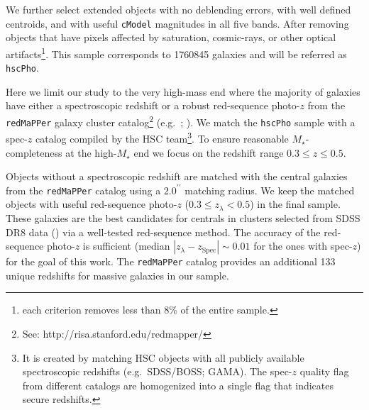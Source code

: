 \documentclass[a4paper,fleqn,usenatbib]{mnras}
\def\arcsec{{\prime\prime}}
\def\redm{\texttt{redMaPPer}}
\def\mstar{{$M_{\star}$}}
\begin{document}
    We further select extended objects with no deblending errors, with well defined 
    centroids, and with useful \texttt{cModel} magnitudes in all five bands. 
    After removing objects that have pixels affected by saturation, cosmic-rays, or 
    other optical artifacts\footnote{each criterion removes less than 8\% of the 
    entire sample.}. This sample corresponds to 1760845 galaxies and will be referred 
    as \texttt{hscPho}. 
        
    Here we limit our study to the very high-mass end where the majority of galaxies 
    have either a spectroscopic redshift or a robust red-sequence photo-$z$ from the 
    \redm{} galaxy cluster catalog\footnote{See: http://risa.stanford.edu/redmapper/} 
    (e.g.\ \citealt{Rykoff2014}; \citealt{Rozo2015b}).  
    We match the \texttt{hscPho} sample with a spec-$z$ catalog compiled by the HSC 
    team\footnote{It is created by matching HSC objects with all publicly available 
    spectroscopic redshifts (e.g.\ SDSS/BOSS; GAMA). 
    The spec-$z$ quality flag from different catalogs are homogenized into a single 
    flag that indicates secure redshifts.}.  
    To ensure reasonable \mstar{}-completeness at the high-\mstar{} end we focus on
    the redshift range $0.3 \leq z \leq 0.5$. 
   
    Objects without a spectroscopic redshift are matched with the central 
    galaxies from the \redm{} catalog using a $2.0^{\arcsec}$ matching radius. 
    We keep the matched objects with useful red-sequence photo-$z$ 
    ($0.3 \leq z_{\lambda} < 0.5$) in the final sample. 
    These galaxies are the best candidates for centrals in clusters selected from 
    SDSS DR8 data (\citealt{SDSSDR8}) via a well-tested red-sequence method. 
    The accuracy of the red-sequence photo-$z$ is sufficient (median 
    $|z_{\lambda} - z_{\mathrm{Spec}}| {\sim} 0.01$ for the ones with spec-$z$) 
    for the goal of this work.
    The \redm{} catalog provides an additional 133 unique redshifts for massive 
    galaxies in our sample.
        
\end{document}
